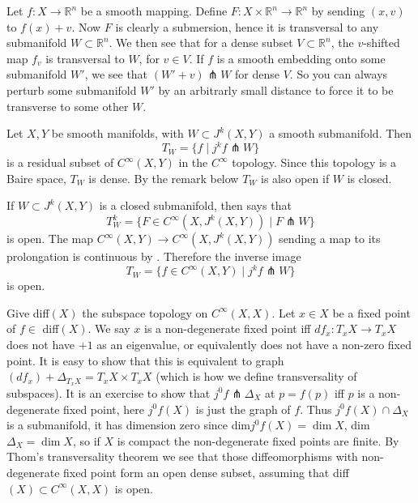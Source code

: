 \documentclass[12pt]{article}
\newcommand{\RR}{\mathbb{R}}
\begin{document}
\begin{example}
    Let $f: X \to \RR^n$ be a smooth mapping. Define $F: X \times \RR^n \to \RR^n$ by sending $(x, v)$ to $f(x) + v$. Now $F$ is clearly a submersion, hence it is transversal to any submanifold $W \subset \RR^n$. We then see that for a dense subset $V \subset \RR^n$, the $v$-shifted map $f_v$ is transversal to $W$, for $v\in V$. If $f$ is a smooth embedding onto some submanifold $W'$, we see that $\left(W' + v\right) \pitchfork W$ for dense $V$. So you can always perturb some submanifold $W'$ by an arbitrarly small distance to force it to be transverse to some other $W$. 
\end{example}


\begin{theorem} \label{Thoms trans}
    Let $X, Y$ be smooth manifolds, with $W \subset J^k(X, Y)$ a smooth submanifold. Then 
    $$
    T_W = \{ f \mid j^k f \pitchfork W\}
    $$
    is a residual subset of $C^\infty(X, Y)$ in the $C^\infty$ topology. Since this topology is a Baire space, $T_W$ is dense. By the remark below $T_W$ is also open if $W$ is closed. 
\end{theorem}

\begin{remark}
    If $W \subset J^k(X, Y)$ is a closed submanifold, then  says that
    $$
    T_W^k =\{ F \in C^\infty(X, J^k(X, Y)) \mid F \pitchfork W\}
    $$
    is open. The map $C^\infty(X, Y) \to C^\infty(X, J^k(X, Y))$ sending a map to its prolongation is continuous by . Therefore the inverse image 
    $$
    T_W = \{ f\in C^\infty(X, Y) \mid j^k f \pitchfork W\}
    $$
    is open. 
\end{remark}

\begin{example}
    Give diff$(X)$ the subspace topology on $C^\infty(X, X)$. Let $x\in X$ be a fixed point of $f \in$ diff$(X)$. We say $x$ is a non-degenerate fixed point iff $df_x: T_x X \to T_x X$ does not have $+1$ as an eigenvalue, or equivalently does not have a non-zero fixed point. It is easy to show that this is equivalent to graph$(df_x) + \Delta_{T_x X} = T_x X \times T_x X$ (which is how we define transversality of subspaces). It is an exercise to show that $j^0 f \pitchfork \Delta_X$ at $p = f(p)$ iff $p$ is a non-degenerate fixed point, here $j^0 f(X)$ is just the graph of $f$.  Thus $j^0 f(X) \cap \Delta_X$ is a submanifold, it has dimension zero since dim$j^0 f(X) = \dim X$, dim$\Delta_X = \dim X$, so if $X$ is compact the non-degenerate fixed points are finite. By Thom's transversality theorem we see that those diffeomorphisms with non-degenerate fixed point form an open dense subset, assuming that diff$(X) \subset C^\infty(X, X)$ is open. 
\end{example}
\end{document}
